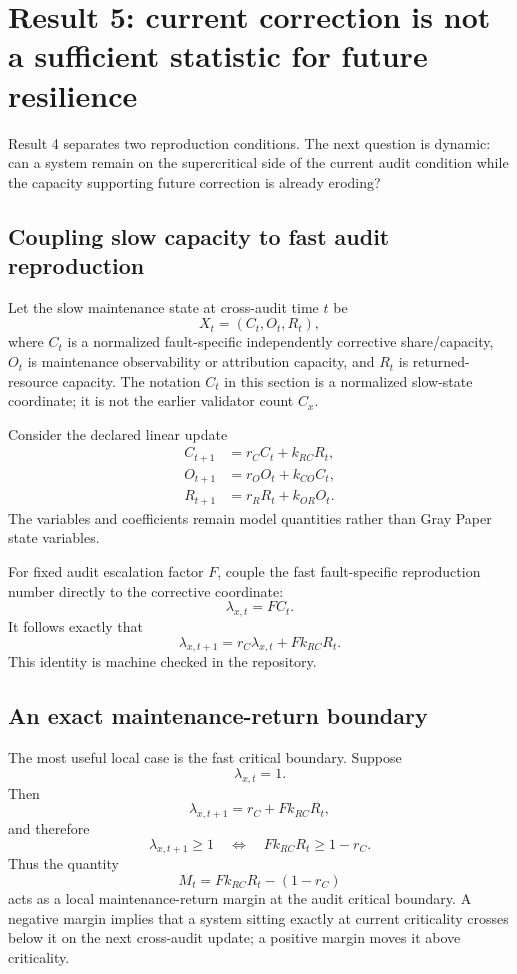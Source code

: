 \section{Result 5: current correction is not a sufficient statistic for future resilience}
\label{sec:resilience-dynamics}

Result 4 separates two reproduction conditions. The next question is dynamic: can a system remain on the supercritical side of the current audit condition while the capacity supporting future correction is already eroding?

\subsection{Coupling slow capacity to fast audit reproduction}

Let the slow maintenance state at cross-audit time $t$ be
\[
X_t=(C_t,O_t,R_t),
\]
where $C_t$ is a normalized fault-specific independently corrective share/capacity, $O_t$ is maintenance observability or attribution capacity, and $R_t$ is returned-resource capacity. The notation $C_t$ in this section is a normalized slow-state coordinate; it is not the earlier validator count $C_x$.

Consider the declared linear update
\begin{align}
C_{t+1}&=r_C C_t+k_{RC}R_t,\\
O_{t+1}&=r_O O_t+k_{CO}C_t,\\
R_{t+1}&=r_R R_t+k_{OR}O_t.
\end{align}
The variables and coefficients remain model quantities rather than Gray Paper state variables.

For fixed audit escalation factor $F$, couple the fast fault-specific reproduction number directly to the corrective coordinate:
\[
\lambda_{x,t}=F C_t.
\]
It follows exactly that
\[
\lambda_{x,t+1}
=r_C\lambda_{x,t}+F k_{RC}R_t.
\]
This identity is machine checked in the repository.

\subsection{An exact maintenance-return boundary}

The most useful local case is the fast critical boundary. Suppose
\[
\lambda_{x,t}=1.
\]
Then
\[
\lambda_{x,t+1}=r_C+F k_{RC}R_t,
\]
and therefore
\[
\boxed{
\lambda_{x,t+1}\ge1
\quad\Longleftrightarrow\quad
F k_{RC}R_t\ge1-r_C.
}
\]
Thus the quantity
\[
\boxed{
M_t=F k_{RC}R_t-(1-r_C)
}
\]
acts as a local maintenance-return margin at the audit critical boundary. A negative margin implies that a system sitting exactly at current criticality crosses below it on the next cross-audit update; a positive margin moves it above criticality.

